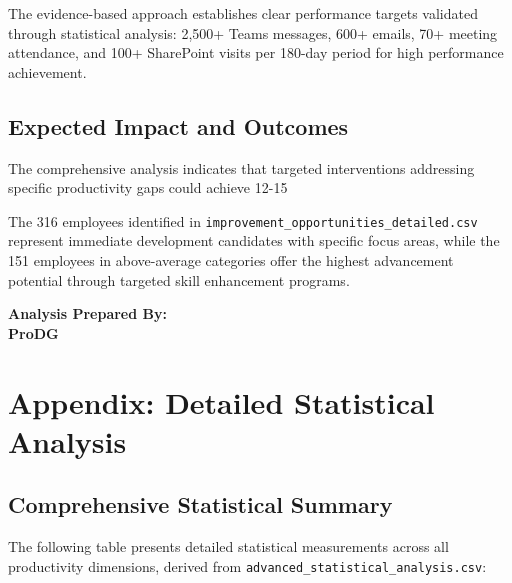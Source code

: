 \documentclass[12pt,a4paper]{article}
\begin{document}
The evidence-based approach establishes clear performance targets validated through statistical analysis: 2,500+ Teams messages, 600+ emails, 70+ meeting attendance, and 100+ SharePoint visits per 180-day period for high performance achievement.

\subsection{Expected Impact and Outcomes}

The comprehensive analysis indicates that targeted interventions addressing specific productivity gaps could achieve 12-15%

The 316 employees identified in \texttt{improvement\_opportunities\_detailed.csv} represent immediate development candidates with specific focus areas, while the 151 employees in above-average categories offer the highest advancement potential through targeted skill enhancement programs.

\vspace{1cm}

\begin{center}
\large\textbf{\color{primaryBlue}Analysis Prepared By:}\\[0.5cm]
\textbf{ProDG}\\
\end{center}

\newpage

\section*{Appendix: Detailed Statistical Analysis}

\subsection*{Comprehensive Statistical Summary}

The following table presents detailed statistical measurements across all productivity dimensions, derived from \texttt{advanced\_statistical\_analysis.csv}:
\end{document}
